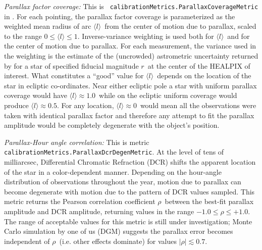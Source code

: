 {\it Parallax factor coverage:} This is {\tt
  calibrationMetrics.ParallaxCoverageMetric} in \MAF. For
  each pointing, the parallax factor coverage is parameterized as the
  weighted mean radius of arc $\langle l \rangle$~from the center of
  motion due to parallax, scaled to the range $0 \le \langle l \rangle
  \le 1$. Inverse-variance weighting is used both for $\langle l \rangle$~and for the center of motion due to parallax.
For each measurement,
  the variance used in the weighting is the estimate of the
  (uncrowded) astrometric uncertainty returned by \OpSim for a star of
  specified fiducial magnitude $r$~at the center of the HEALPIX of
  interest. What constitutes a ``good'' value for $\langle l \rangle$~depends on the location
  of the star in ecliptic co-ordinates. Near either ecliptic pole a
  star with uniform parallax coverage would have $\langle l \rangle
  \approx 1.0$~while on the ecliptic uniform coverage would produce
  $\langle l \rangle \approx 0.5$. For any location, $\langle l
  \rangle \approx 0$~would mean all the observations were taken with
  identical parallax factor and therefore any attempt to fit the
  parallax amplitude would be completely degenerate with the object's
  position.

{\it Parallax-Hour angle correlation:} This is metric {\tt
    calibrationMetrics.ParallaxDcrDegenMetric}. At the level of tens
  of milliarcsec, Differential Chromatic Refraction (DCR) shifts the
  apparent location of the star in a color-dependent manner. Depending
  on the hour-angle distribution of observations throughout the year,
  motion due to parallax can become degenerate with motion due to the
  pattern of DCR values sampled. This metric returns the Pearson
  correlation coefficient $\rho$~between the best-fit parallax
  amplitude and DCR amplitude, returning values in the range $-1.0 \le
  \rho \le +1.0$. The range of acceptable values for this metric is
  still under investigation; Monte Carlo simulation by one of us (DGM)
  suggests the parallax error becomes independent of
  $\rho$~(i.e. other effects dominate) for values $|\rho| \lesssim
  0.7$.



